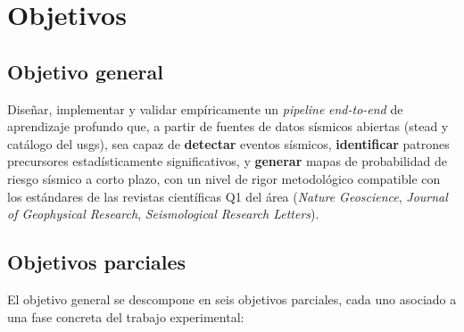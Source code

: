 
\cleardoublepage

\chapter{Objetivos}
\label{objetivos}

\section{Objetivo general}
\label{objetivo-general}

Diseñar, implementar y validar empíricamente un \emph{pipeline} \textit{end-to-end} de aprendizaje profundo que, a partir de fuentes de datos sísmicos abiertas (\gls{stead} y catálogo del \gls{usgs}), sea capaz de \textbf{detectar} eventos sísmicos, \textbf{identificar} patrones precursores estadísticamente significativos, y \textbf{generar} mapas de probabilidad de riesgo sísmico a corto plazo, con un nivel de rigor metodológico compatible con los estándares de las revistas científicas Q1 del área (\textit{Nature Geoscience}, \textit{Journal of Geophysical Research}, \textit{Seismological Research Letters}).

\section{Objetivos parciales}
\label{objetivos-parciales}

El objetivo general se descompone en seis objetivos parciales, cada uno asociado a una fase concreta del trabajo experimental:

